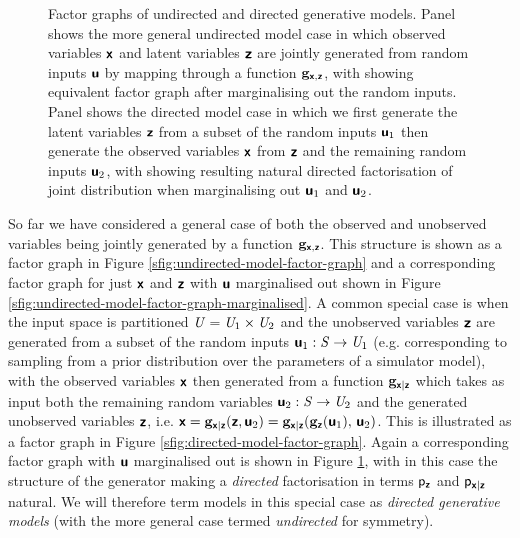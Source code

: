 \begin{figure}[!t]
\begin{subfigure}[t]{.2\linewidth}
\begin{tikzpicture}
\end{tikzpicture}
\caption{}\label{sfig:directed-model-factor-graph-marginalised}
\end{subfigure}%
\caption[Undirected and directed generative models.]{Factor graphs of undirected and directed generative models. Panel  shows the more general undirected model case in which observed variables $\rvct{x}$ and latent variables $\rvct{z}$ are jointly generated from random inputs $\rvct{u}$ by mapping through a function $\vctfunc{g}_{\rvct{x},\rvct{z}}$, with  showing equivalent factor graph after marginalising out the random inputs. Panel  shows the directed model case in which we first generate the latent variables $\rvct{z}$ from a subset of the random inputs $\rvct{u}_{1}$ then generate the observed variables $\rvct{x}$ from $\rvct{z}$ and the remaining random inputs $\rvct{u}_{2}$, with  showing resulting natural directed factorisation of joint distribution when marginalising out $\rvct{u}_1$ and $\rvct{u}_2$.}
\label{fig:directed-undirected-model-graphs}
\end{figure}

So far we have considered a general case of both the observed and unobserved variables being jointly generated by a function $\genfunc_{\rvct{x},\rvct{z}}$. This structure is shown as a factor graph in Figure \ref{sfig:undirected-model-factor-graph} and a corresponding factor graph for just $\rvct{x}$ and $\rvct{z}$ with $\rvct{u}$ marginalised out shown in Figure \ref{sfig:undirected-model-factor-graph-marginalised}. A common special case is when the input space is partitioned $\set{U} = \set{U}_1 \times \set{U}_2$ and the unobserved variables $\rvct{z}$ are generated from a subset of the random inputs $\rvct{u}_1 : \set{S} \to \set{U}_1$ (e.g. corresponding to sampling from a prior distribution over the parameters of a simulator model), with the observed variables $\rvct{x}$ then generated from a function $\genfunc_{\rvct{x}|\rvct{z}}$ which takes as input both the remaining random variables $\rvct{u}_2 : \set{S} \to \set{U}_2$ and the generated unobserved variables $\rvct{z}$, i.e. $\rvct{x} = \genfunc_{\rvct{x}|\rvct{z}}(\rvct{z},\rvct{u}_2) = \genfunc_{\rvct{x}|\rvct{z}}\lpa\genfunc_{\rvct{z}}(\rvct{u}_1),\,\rvct{u}_2\rpa$. This is illustrated as a factor graph in Figure \ref{sfig:directed-model-factor-graph}. Again a corresponding factor graph with $\rvct{u}$ marginalised out is shown in Figure \ref{sfig:directed-model-factor-graph-marginalised}, with in this case the structure of the generator making a \emph{directed} factorisation in terms $\pden{\rvct{z}}$ and $\pden{\rvct{x}|\rvct{z}}$ natural. We will therefore term models in this special case as \emph{directed generative models} (with the more general case termed \emph{undirected} for symmetry).

